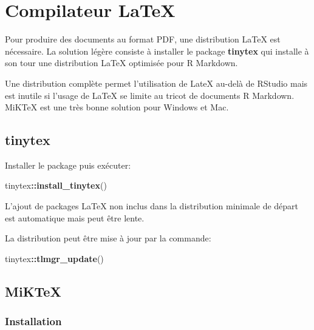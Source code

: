 \documentclass[
  12pt,
  french,
  a4paper,
  extrafontsizes,onecolumn,openright
  ]{memoir}
\newenvironment{Shaded}{\begin{snugshade}}{\end{snugshade}}
\newcommand{\FunctionTok}[1]{\textcolor[rgb]{0.13,0.29,0.53}{\textbf{#1}}}
\newcommand{\NormalTok}[1]{#1}
\newcommand{\SpecialCharTok}[1]{\textcolor[rgb]{0.81,0.36,0.00}{\textbf{#1}}}
\begin{document}
\section{Compilateur LaTeX}\label{compilateur-latex}

Pour produire des documents au format PDF, une distribution LaTeX est nécessaire.
La solution légère consiste à installer le package \textbf{tinytex} qui installe à son tour une distribution LaTeX optimisée pour R Markdown.

Une distribution complète permet l'utilisation de LateX au-delà de RStudio mais est inutile si l'usage de LaTeX se limite au tricot de documents R Markdown.
MiKTeX est une très bonne solution pour Windows et Mac.

\subsection{tinytex}\label{tinytex}

Installer le package puis exécuter:

\scriptsize

\begin{Shaded}
\begin{Highlighting}[]
\NormalTok{tinytex}\SpecialCharTok{::}\FunctionTok{install\_tinytex}\NormalTok{()}
\end{Highlighting}
\end{Shaded}

\normalsize

L'ajout de packages LaTeX non inclus dans la distribution minimale de départ est automatique mais peut être lente.

La distribution peut être mise à jour par la commande:

\scriptsize

\begin{Shaded}
\begin{Highlighting}[]
\NormalTok{tinytex}\SpecialCharTok{::}\FunctionTok{tlmgr\_update}\NormalTok{()}
\end{Highlighting}
\end{Shaded}

\normalsize

\subsection{MiKTeX}\label{miktex}

\subsubsection{Installation}\label{installation-2}
\end{document}
